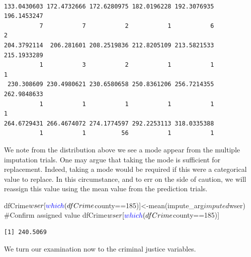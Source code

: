 \documentclass[]{article}
\newenvironment{Shaded}{}{}
\newcommand{\CommentTok}[1]{\textcolor[rgb]{0.00,0.50,0.00}{#1}}
\newcommand{\DecValTok}[1]{#1}
\newcommand{\KeywordTok}[1]{\textcolor[rgb]{0.00,0.00,1.00}{#1}}
\newcommand{\NormalTok}[1]{#1}
\newcommand{\OperatorTok}[1]{#1}
\begin{document}
\begin{verbatim}

133.0430603 172.4732666 172.6280975 182.0196228 192.3076935 196.1453247 
          7           7           2           1           6           2 
204.3792114  206.281601 208.2519836 212.8205109 213.5821533 215.1933289 
          1           3           2           1           1           1 
 230.308609 230.4980621 230.6580658 250.8361206 256.7214355 262.9848633 
          1           1           1           1           1           1 
264.6729431 266.4674072 274.1774597 292.2253113 318.0335388 
          1           1          56           1           1 
\end{verbatim}

We note from the distribution above we see a mode appear from the
multiple imputation trials. One may argue that taking the mode is
sufficient for replacement. Indeed, taking a mode would be required if
this were a categorical value to replace. In this circumstance, and to
err on the side of caution, we will reassign this value using the mean
value from the prediction trials.

\begin{Shaded}
\begin{Highlighting}[]
\NormalTok{dfCrime}\OperatorTok{$}\NormalTok{wser[}\KeywordTok{which}\NormalTok{(dfCrime}\OperatorTok{$}\NormalTok{county}\OperatorTok{==}\DecValTok{185}\NormalTok{)]<-}\KeywordTok{mean}\NormalTok{(impute_arg}\OperatorTok{$}\NormalTok{imputed}\OperatorTok{$}\NormalTok{wser)}
\CommentTok{#Confirm assigned value}
\NormalTok{dfCrime}\OperatorTok{$}\NormalTok{wser[}\KeywordTok{which}\NormalTok{(dfCrime}\OperatorTok{$}\NormalTok{county}\OperatorTok{==}\DecValTok{185}\NormalTok{)]}
\end{Highlighting}
\end{Shaded}

\begin{verbatim}
[1] 240.5069
\end{verbatim}

We turn our examination now to the criminal justice variables.
\end{document}
